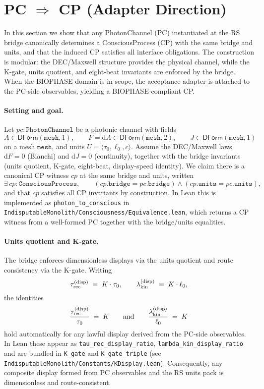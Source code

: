 \documentclass[12pt,a4paper]{article}
\begin{document}
\section{PC \texorpdfstring{$\Rightarrow$}{⇒} CP (Adapter Direction)}
\label{sec:pc-to-cp}

In this section we show that any PhotonChannel (PC) instantiated at the RS bridge canonically determines a ConsciousProcess (CP) with the same bridge and units, and that the induced CP satisfies all interface obligations. The construction is modular: the DEC/Maxwell structure provides the physical channel, while the K-gate, units quotient, and eight-beat invariants are enforced by the bridge. When the BIOPHASE domain is in scope, the acceptance adapter is attached to the PC-side observables, yielding a BIOPHASE-compliant CP.

\paragraph{Setting and goal.}
Let \(pc:\texttt{PhotonChannel}\) be a photonic channel with fields
\[
  A\in \mathsf{DForm}(\texttt{mesh},1),\qquad
  F=\mathrm{d}A\in \mathsf{DForm}(\texttt{mesh},2),\qquad
  J\in \mathsf{DForm}(\texttt{mesh},1)
\]
on a mesh \(\texttt{mesh}\), and units \(U=\langle \tau_0,\ell_0,c\rangle\). Assume the DEC/Maxwell laws
\(
  \mathrm{d}F=0
\) (Bianchi)
and
\(
  \mathrm{d}J=0
\) (continuity),
together with the bridge invariants (units quotient, K-gate, eight-beat, display-speed identity). We claim there is a canonical CP witness \(cp\) at the same bridge and units, written
\[
  \exists\, cp:\texttt{ConsciousProcess},\qquad
  (cp.\texttt{bridge}=pc.\texttt{bridge})
  \wedge
  (cp.\texttt{units}=pc.\texttt{units}),
\]
and that \(cp\) satisfies all CP invariants by construction. In Lean this is implemented as \texttt{photon\_to\_conscious} in \texttt{IndisputableMonolith/Consciousness/Equivalence.lean}, which returns a CP witness from a well-formed PC together with the bridge/units equalities.

\paragraph{Units quotient and K-gate.}
The bridge enforces dimensionless displays via the units quotient and route consistency via the K-gate. Writing
\[
  \tau_{\rm rec}^{\rm (disp)} \;=\; K\cdot \tau_0,
  \qquad
  \lambda_{\rm kin}^{\rm (disp)} \;=\; K\cdot \ell_0,
\]
the identities
\[
  \frac{\tau_{\rm rec}^{\rm (disp)}}{\tau_0} \;=\; K
  \qquad\text{and}\qquad
  \frac{\lambda_{\rm kin}^{\rm (disp)}}{\ell_0} \;=\; K
\]
hold automatically for any lawful display derived from the PC-side observables. In Lean these appear as \texttt{tau\_rec\_display\_ratio}, \texttt{lambda\_kin\_display\_ratio} and are bundled in \texttt{K\_gate} and \texttt{K\_gate\_triple} (see \texttt{IndisputableMonolith/Constants/KDisplay.lean}). Consequently, any composite display formed from PC observables and the RS units pack is dimensionless and route-consistent.
\end{document}
